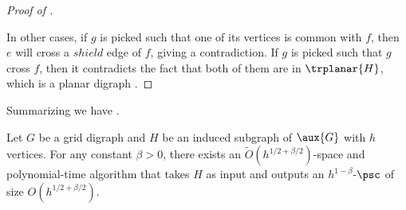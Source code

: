 \documentclass{toc}
\begin{document}
\begin{proof}[Proof of ]
\begin{description}
\begin{description}
\end{description}
\end{description}
In other cases, if $g$ is picked such that one of its vertices is common with $f$, then $e$ will cross a $shield$ edge of $f$, giving a contradiction. If $g$ is picked such that $g$ cross $f$, then it contradicts the fact that both of them are %
 in $\trplanar{H}$, which is a planar %
digraph %
.
\end{proof}
Summarizing   we have .
\begin{theorem} \label{thm:constructpsc}
Let $G$ be a grid %
digraph %
 and $H$ be %
an%
induced subgraph of $\aux{G}$ with $h$ vertices. For any constant $\beta > 0$, there exists an $\tilde{O}(h^{1/2 + \beta/2})$-space and polynomial-time %
algorithm that takes $H$ as input and outputs an $h^{1-\beta}$-$\psc$ of size $O(h^{1/2 + \beta/2})$.
\end{theorem}

%
\end{document}
